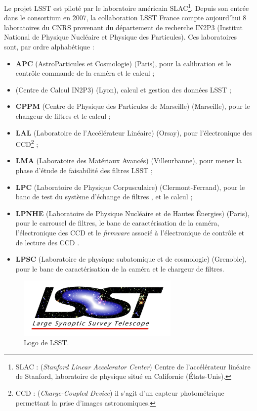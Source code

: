 Le projet LSST est piloté par le laboratoire américain SLAC\footnote{SLAC : (\emph{Stanford Linear Accelerator Center}) Centre de l'accélérateur linéaire de Stanford, laboratoire de physique situé en Californie (États-Unis).}. Depuis son entrée dans le consortium en 2007, la collaboration LSST France compte aujourd'hui 8 laboratoires du CNRS provenant du département de recherche IN2P3 (Institut National de Physique Nucléaire et Physique des Particules). Ces laboratoires sont, par ordre alphabétique :
	\begin{itemize}
		\item \textbf{APC} (AstroParticules et Cosmologie) (Paris), pour la calibration et le contrôle commande de la caméra et le calcul ;
		\item \textbf{\CC} (Centre de Calcul IN2P3) (Lyon), calcul et gestion des données LSST ;
		\item \textbf{CPPM} (Centre de Physique des Particules de Marseille) (Marseille), pour le changeur de filtres et le calcul ;
		\item \textbf{LAL} (Laboratoire de l'Accélérateur Linéaire) (Orsay), pour l'électronique des CCD\footnote{CCD : (\emph{Charge-Coupled Device}) il s'agit d'un capteur photométrique permettant la prise d'images astronomiques.} ;
		\item \textbf{LMA} (Laboratoire des Matériaux Avancés) (Villeurbanne), pour mener la phase d'étude de faisabilité des filtres LSST ;
		\item \textbf{LPC} (Laboratoire de Physique Corpusculaire) (Clermont-Ferrand), pour le banc de test du système d'échange de filtres , et le calcul ;
		\item \textbf{LPNHE} (Laboratoire de Physique Nucléaire et de Hautes Énergies) (Paris), pour le carrousel de filtres, le banc de caractérisation de la caméra, l'électronique des CCD et le \emph{firmware} associé à l'électronique de contrôle et de lecture des CCD .
		\item \textbf{LPSC} (Laboratoire de physique subatomique et de cosmologie) (Grenoble), pour le banc de caractérisation de la caméra et le chargeur de filtres.
	\end{itemize}

	\begin{figure}[h!]
		\centering
		\includegraphics[width=0.7\textwidth]{img/logo_LSST.png}
		\caption[Logo de LSST]{Logo de LSST.}
	\end{figure}


